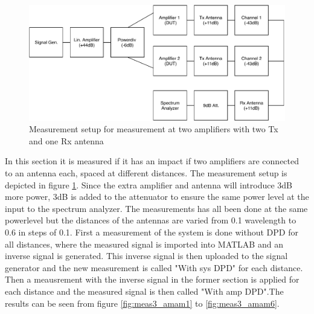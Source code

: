 \begin{figure}[H]
\centering 
\includegraphics[scale = 0.9]{figures/measurement/cree/meas3/meas3.pdf}
\caption{Measurement setup for measurement at two amplifiers with two Tx and one Rx antenna}
\label{fig:meas_amp3}
\end{figure}

In this section it is measured if it has an impact if two amplifiers are connected to an antenna each, spaced at different distances. The measurement setup is depicted in figure \ref{fig:meas_amp3}. Since the extra amplifier and antenna will introduce 3dB more power, 3dB is added to the attenuator to ensure the same power level at the input to the spectrum analyzer. The measurements has all been done at the same powerlevel but the distances of the antennas are varied from 0.1 wavelength to 0.6 in steps of 0.1. First a measurement of the system is done without DPD for all distances, where the measured signal is imported into MATLAB and an inverse signal is generated. This inverse signal is then uploaded to the signal generator and the new measurement is called "With sys DPD" for each distance. Then a meausrement with the inverse signal in the former section is applied for each distance and the measured signal is then called "With amp DPD".The results can be seen from figure \ref{fig:meas3_amam1} to \ref{fig:meas3_amam6}.   


